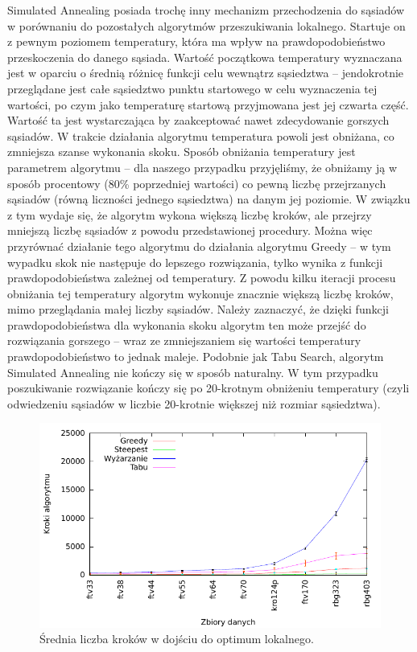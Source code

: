 Simulated Annealing posiada trochę inny mechanizm przechodzenia do sąsiadów w porównaniu do pozostałych algorytmów przeszukiwania lokalnego. Startuje on z pewnym poziomem temperatury, która ma wpływ na prawdopodobieństwo przeskoczenia do danego sąsiada. Wartość początkowa temperatury wyznaczana jest w oparciu o średnią różnicę funkcji celu wewnątrz sąsiedztwa -- jendokrotnie przeglądane jest całe sąsiedztwo punktu startowego w celu wyznaczenia tej wartości, po czym jako temperaturę startową przyjmowana jest jej czwarta część. Wartość ta jest wystarczająca by zaakceptować nawet zdecydowanie gorszych sąsiadów. W trakcie działania algorytmu temperatura powoli jest obniżana, co zmniejsza szanse wykonania skoku. Sposób obniżania temperatury jest parametrem algorytmu -- dla naszego przypadku przyjęliśmy, że obniżamy ją w sposób procentowy (80\% poprzedniej wartości) co pewną liczbę przejrzanych sąsiadów (równą liczności jednego sąsiedztwa) na danym jej poziomie. W związku z tym wydaje się, że algorytm wykona większą liczbę kroków, ale przejrzy mniejszą liczbę sąsiadów z powodu przedstawionej procedury. Można więc przyrównać działanie tego algorytmu do działania algorytmu Greedy -- w tym wypadku skok nie następuje do lepszego rozwiązania, tylko wynika z funkcji prawdopodobieństwa zależnej od temperatury. Z powodu kilku iteracji procesu obniżania tej temperatury algorytm wykonuje znacznie większą liczbę kroków, mimo przeglądania małej liczby sąsiadów. Należy zaznaczyć, że dzięki funkcji prawdopodobieństwa dla wykonania skoku algorytm ten może przejść do rozwiązania gorszego -- wraz ze zmniejszaniem się wartości temperatury prawdopodobieństwo to jednak maleje. Podobnie jak Tabu Search, algorytm Simulated Annealing nie kończy się w sposób naturalny. W tym przypadku poszukiwanie rozwiązanie kończy się po 20-krotnym obniżeniu temperatury (czyli odwiedzeniu sąsiadów w liczbie 20-krotnie większej niż rozmiar sąsiedztwa).

\begin{figure}[!h]
\centering\includegraphics[width=12cm]{img/loc_skoki}
\caption{Średnia liczba kroków w dojściu do optimum lokalnego.}\label{rys:loc_skoki}
\end{figure}

